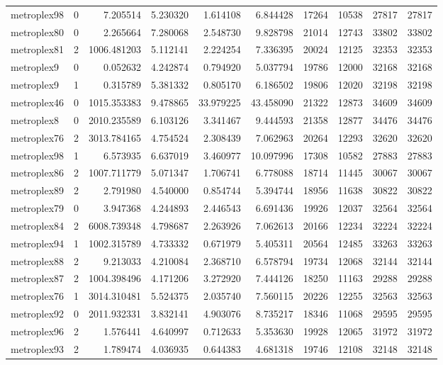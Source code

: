 \begin{longtable}{|l|r|r|r|r|r|r|r|r|r|}
metroplex98 & 0 & 7.205514 & 5.230320 & 1.614108 & 6.844428 & 17264 & 10538 & 27817 & 27817 \\
metroplex80 & 0 & 2.265664 & 7.280068 & 2.548730 & 9.828798 & 21014 & 12743 & 33802 & 33802 \\
metroplex81 & 2 & 1006.481203 & 5.112141 & 2.224254 & 7.336395 & 20024 & 12125 & 32353 & 32353 \\
metroplex9 & 0 & 0.052632 & 4.242874 & 0.794920 & 5.037794 & 19786 & 12000 & 32168 & 32168 \\
metroplex9 & 1 & 0.315789 & 5.381332 & 0.805170 & 6.186502 & 19806 & 12020 & 32198 & 32198 \\
metroplex46 & 0 & 1015.353383 & 9.478865 & 33.979225 & 43.458090 & 21322 & 12873 & 34609 & 34609 \\
metroplex8 & 0 & 2010.235589 & 6.103126 & 3.341467 & 9.444593 & 21358 & 12877 & 34476 & 34476 \\
metroplex76 & 2 & 3013.784165 & 4.754524 & 2.308439 & 7.062963 & 20264 & 12293 & 32620 & 32620 \\
metroplex98 & 1 & 6.573935 & 6.637019 & 3.460977 & 10.097996 & 17308 & 10582 & 27883 & 27883 \\
metroplex86 & 2 & 1007.711779 & 5.071347 & 1.706741 & 6.778088 & 18714 & 11445 & 30067 & 30067 \\
metroplex89 & 2 & 2.791980 & 4.540000 & 0.854744 & 5.394744 & 18956 & 11638 & 30822 & 30822 \\
metroplex79 & 0 & 3.947368 & 4.244893 & 2.446543 & 6.691436 & 19926 & 12037 & 32564 & 32564 \\
metroplex84 & 2 & 6008.739348 & 4.798687 & 2.263926 & 7.062613 & 20166 & 12234 & 32224 & 32224 \\
metroplex94 & 1 & 1002.315789 & 4.733332 & 0.671979 & 5.405311 & 20564 & 12485 & 33263 & 33263 \\
metroplex88 & 2 & 9.213033 & 4.210084 & 2.368710 & 6.578794 & 19734 & 12068 & 32144 & 32144 \\
metroplex87 & 2 & 1004.398496 & 4.171206 & 3.272920 & 7.444126 & 18250 & 11163 & 29288 & 29288 \\
metroplex76 & 1 & 3014.310481 & 5.524375 & 2.035740 & 7.560115 & 20226 & 12255 & 32563 & 32563 \\
metroplex92 & 0 & 2011.932331 & 3.832141 & 4.903076 & 8.735217 & 18346 & 11068 & 29595 & 29595 \\
metroplex96 & 2 & 1.576441 & 4.640997 & 0.712633 & 5.353630 & 19928 & 12065 & 31972 & 31972 \\
metroplex93 & 2 & 1.789474 & 4.036935 & 0.644383 & 4.681318 & 19746 & 12108 & 32148 & 32148 \\

\end{longtable}

